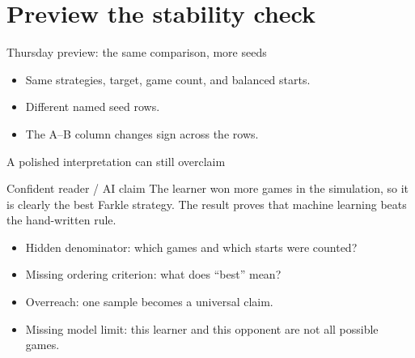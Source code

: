 \section{Preview the stability check}
\begin{frame}[shrink=18]{Thursday preview: the same comparison, more seeds}
\begin{center}
\end{center}
\vspace{4pt}
\begin{itemize}
\item Same strategies, target, game count, and balanced starts.
\item Different named seed rows.
\item The A--B column changes sign across the rows.
\end{itemize}
\end{frame}

\begin{frame}[shrink=18]{A polished interpretation can still overclaim}
\begin{alertblock}{Confident reader / AI claim}
The learner won more games in the simulation, so it is clearly the best Farkle strategy. The result proves that machine learning beats the hand-written rule.
\end{alertblock}
\begin{itemize}
\item Hidden denominator: which games and which starts were counted?
\item Missing ordering criterion: what does ``best'' mean?
\item Overreach: one sample becomes a universal claim.
\item Missing model limit: this learner and this opponent are not all possible games.
\end{itemize}
\end{frame}

